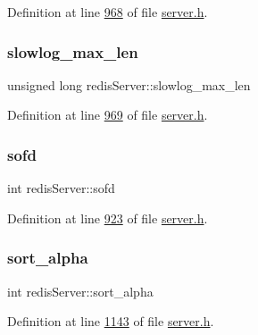 Definition at line \hyperlink{server_8h_source_l00968}{968} of file \hyperlink{server_8h_source}{server.\+h}.

\mbox{\label{structredisServer_a78d3a432690b85b2ca85a7e50b74d727}} 
\subsubsection{\texorpdfstring{slowlog\+\_\+max\+\_\+len}{slowlog\_max\_len}}
{\footnotesize\ttfamily unsigned long redis\+Server\+::slowlog\+\_\+max\+\_\+len}



Definition at line \hyperlink{server_8h_source_l00969}{969} of file \hyperlink{server_8h_source}{server.\+h}.

\mbox{\label{structredisServer_a1715ab0dee351c1b65640a5c063deef3}} 
\subsubsection{\texorpdfstring{sofd}{sofd}}
{\footnotesize\ttfamily int redis\+Server\+::sofd}



Definition at line \hyperlink{server_8h_source_l00923}{923} of file \hyperlink{server_8h_source}{server.\+h}.

\mbox{\label{structredisServer_a760b1484100d293580ffafeab87b4f78}} 
\subsubsection{\texorpdfstring{sort\+\_\+alpha}{sort\_alpha}}
{\footnotesize\ttfamily int redis\+Server\+::sort\+\_\+alpha}



Definition at line \hyperlink{server_8h_source_l01143}{1143} of file \hyperlink{server_8h_source}{server.\+h}.

\mbox{\label{structredisServer_aa61e00801374bbdcafe8851a1267afb1}} 
